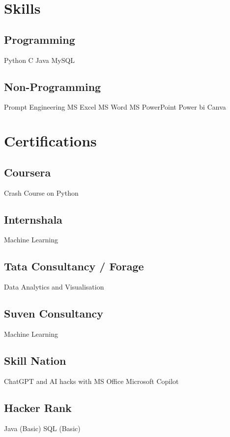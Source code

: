 \documentclass[]{deedy-resume-openfont}
\begin{document}
\begin{minipage}[t]{0.46\textwidth}

\section{Skills}
\subsection{Programming}

Python\textbullet{} C \textbullet{} Java \textbullet{} MySQL\\
\sectionsep

\subsection{Non-Programming}
Prompt Engineering\textbullet{} MS Excel\textbullet{} MS Word \textbullet{} MS PowerPoint \textbullet{} Power bi \textbullet{} Canva
\sectionsep



\section{Certifications}
\subsection{Coursera}
\textbullet{} Crash Course on Python
\subsection{Internshala}
\textbullet{} Machine Learning
\subsection{Tata Consultancy / Forage}
\textbullet{} Data Analytics and Visualisation
\subsection{Suven Consultancy}
\textbullet{} Machine Learning
\subsection{Skill Nation}
\textbullet{} ChatGPT and AI hacks with MS Office
\textbullet{} Microsoft Copilot
\subsection{Hacker Rank}
\textbullet{} Java (Basic)
\textbullet{} SQL (Basic)

%
%

\end{minipage} 
\end{document}
